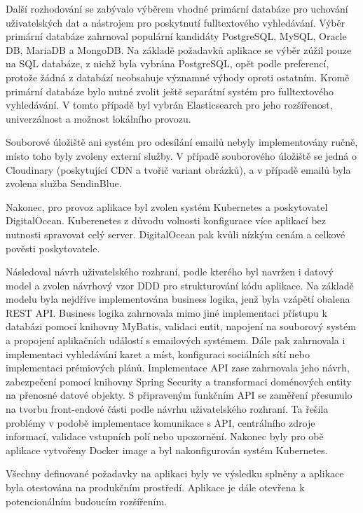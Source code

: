 Další rozhodování se zabývalo výběrem vhodné primární databáze pro uchování uživatelských dat a nástrojem pro
poskytnutí fulltextového vyhledávání.
Výběr primární databáze zahrnoval populární kandidáty PostgreSQL, MySQL, Oracle DB, MariaDB a MongoDB.
Na základě požadavků aplikace se výběr zúžil pouze na \ac{SQL} databáze, z nichž byla vybrána PostgreSQL,
opět podle preferencí, protože žádná z databází neobsahuje významné výhody oproti ostatním.
Kromě primární databáze bylo nutné zvolit ještě separátní systém pro fulltextového vyhledávání.
V tomto případě byl vybrán Elasticsearch pro jeho rozšířenost, univerzálnost a možnost lokálního provozu.

Souborové úložiště ani systém pro odesílání emailů nebyly implementovány ručně, místo toho byly zvoleny externí služby.
V případě souborového úložiště se jedná o Cloudinary (poskytující \ac{CDN} a tvořič variant obrázků), a v případě
emailů byla zvolena služba SendinBlue.

Nakonec, pro provoz aplikace byl zvolen systém Kubernetes a poskytovatel DigitalOcean.
Kuberenetes z důvodu volnosti konfigurace více aplikací bez nutnosti spravovat celý server.
DigitalOcean pak kvůli nízkým cenám a celkové pověsti poskytovatele.

Následoval návrh uživatelského rozhraní, podle kterého byl navržen i datový model a zvolen návrhový vzor \ac{DDD} pro strukturování
kódu aplikace.
Na základě modelu byla nejdříve implementována business logika, jenž byla vzápětí obalena \ac{REST} \ac{API}.
Business logika zahrnovala mimo jiné implementaci přístupu k databázi pomocí knihovny MyBatis, validaci entit, napojení
na souborový systém a propojení aplikačních událostí s emailových systémem.
Dále pak zahrnovala i implementaci vyhledávání karet a míst, konfiguraci sociálních sítí nebo implementaci prémiových plánů.
Implementace \ac{API} zase zahrnovala jeho návrh, zabezpečení pomocí knihovny Spring Security a transformaci
doménových entity na přenosné datové objekty.
S připraveným funkčním \ac{API} se zaměření přesunulo na tvorbu front-endové části podle návrhu uživatelského rozhraní.
Ta řešila problémy v podobě implementace komunikace s \ac{API}, centrálního zdroje informací,
validace vstupních polí nebo upozornění.
Nakonec byly pro obě aplikace vytvořeny Docker image a byl nakonfigurován systém Kubernetes.

Všechny definované požadavky na aplikaci byly ve výsledku splněny a aplikace byla otestována na produkčním prostředí.
Aplikace je dále otevřena k potencionálním budoucím rozšířením.

